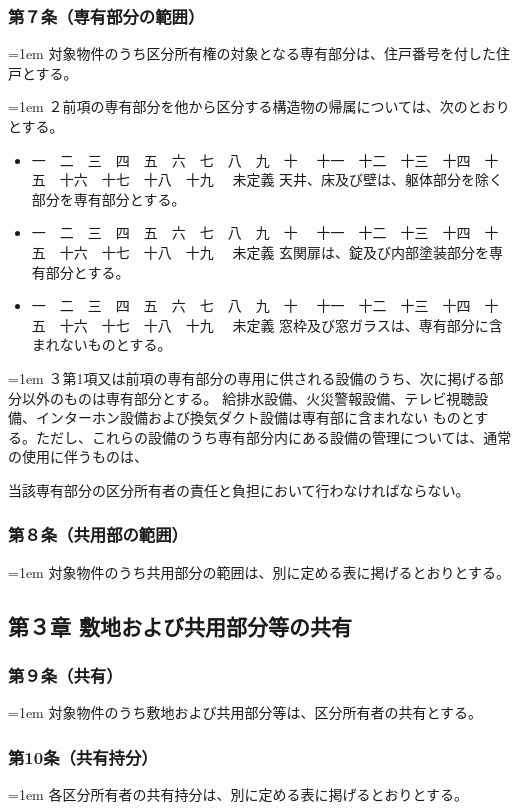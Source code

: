 \documentclass[
  luatex,
  paper=a4paper,
  fontsize=11pt,
  jafontsize=11pt,
  jlreq_notes,
]{jlreq}
\newcommand{\joumain}[1]{%
  \noindent\hangindent=1em\hangafter=1
  \hspace{1em}#1%
}
\newcommand{\kou}[2]{%
  \par\noindent\hangindent=1em\hangafter=1
  #1\hspace{1em}#2%
}
\def\toKansuji#1{
  \tempvls=#1
  \ifcase\tempvls
    \or 一　\or 二　\or 三　\or 四　\or 五　\or 六　\or 七　\or 八　\or 九　\or 十　
    \or 十一　\or 十二　\or 十三　\or 十四　\or 十五　\or 十六　\or 十七　\or 十八　\or 十九　
  \else 未定義
  \fi
}
\begin{document}
  \subsubsection*{ 第７条（専有部分の範囲）}
  \joumain{対象物件のうち区分所有権の対象となる専有部分は、住戸番号を付した住戸とする。}
  \kou{２}{前項の専有部分を他から区分する構造物の帰属については、次のとおりとする。}
  \begin{itemize}[label={}, leftmargin=3em, itemindent=-2em]
    \item \toKansuji{1}天井、床及び壁は、躯体部分を除く部分を専有部分とする。
    \item \toKansuji{2}玄関扉は、錠及び内部塗装部分を専有部分とする。
    \item \toKansuji{3}窓枠及び窓ガラスは、専有部分に含まれないものとする。 
  \end{itemize}
  \kou{３}{第1項又は前項の専有部分の専用に供される設備のうち、次に掲げる部分以外のものは専有部分とする。
  給排水設備、火災警報設備、テレビ視聴設備、インターホン設備および換気ダクト設備は専有部に含まれない
  ものとする。ただし、これらの設備のうち専有部分内にある設備の管理については、通常の使用に伴うものは、}
  当該専有部分の区分所有者の責任と負担において行わなければならない。

  \subsubsection*{第８条（共用部の範囲）}
  \joumain{対象物件のうち共用部分の範囲は、別に定める表に掲げるとおりとする。}
  
  \begin{center}
    \subsection*{第３章 敷地および共用部分等の共有}
  \end{center}

  \subsubsection*{第９条（共有）}
  \joumain{対象物件のうち敷地および共用部分等は、区分所有者の共有とする。}

  \subsubsection*{第10条（共有持分）}
  \joumain{各区分所有者の共有持分は、別に定める表に掲げるとおりとする。}
\end{document}
